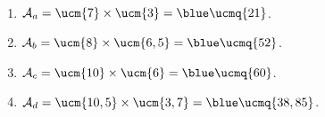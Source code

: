    \ \\ [-5mm]
   \begin{enumerate}
      \item $\mathcal{A}_a =\ucm{7}\times\ucm{3} =\blue \ucmq{21}$.
      \item $\mathcal{A}_b =\ucm{8}\times\ucm{6,5} =\blue \ucmq{52}$.
      \item $\mathcal{A}_c =\ucm{10}\times\ucm{6} =\blue \ucmq{60}$.
      \item $\mathcal{A}_d =\ucm{10,5}\times\ucm{3,7} =\blue \ucmq{38,85}$.
   \end{enumerate}
